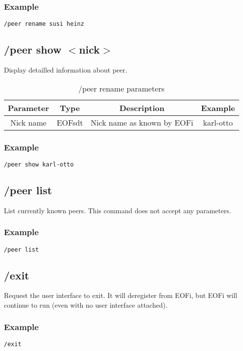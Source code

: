 \documentclass[12pt,a4paper]{book}
\begin{document}
\subsubsection{Example}
\begin{verbatim}
/peer rename susi heinz
\end{verbatim}
\subsection{/peer show $<$nick$>$}
Display detailled information about peer.
%
\begin{longtable}{|c|c|c|c|}
\caption{/peer rename parameters}\\
\hline
\textbf{Parameter} & \textbf{Type} & \textbf{Description} & \textbf{Example}\\
\hline
Nick name & EOFsdt & Nick name as known by EOFi & karl-otto\\
\hline
\end{longtable}

\subsubsection{Example}
\begin{verbatim}
/peer show karl-otto
\end{verbatim}
\subsection{/peer list}
List currently known peers. This command does not accept any parameters.

\subsubsection{Example}
\begin{verbatim}
/peer list
\end{verbatim}
\subsection{/exit}
Request the user interface to exit. It will deregister from EOFi,
but EOFi will continue to run (even with no user interface attached).
\subsubsection{Example}
\begin{verbatim}
/exit
\end{verbatim}
\end{document}
